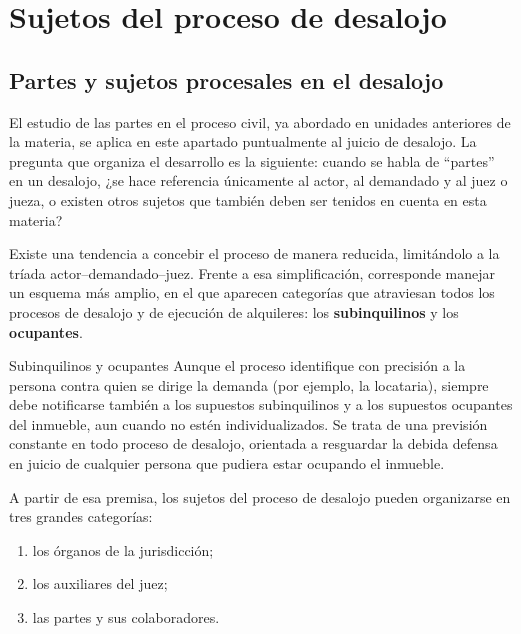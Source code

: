 \documentclass[12pt,oneside]{book}
\begin{document}

\chapter{Sujetos del proceso de desalojo}

\section{Partes y sujetos procesales en el desalojo}

El estudio de las partes en el proceso civil, ya abordado en unidades anteriores de la materia, se aplica en este apartado puntualmente al juicio de desalojo. La pregunta que organiza el desarrollo es la siguiente: cuando se habla de ``partes'' en un desalojo, ¿se hace referencia únicamente al actor, al demandado y al juez o jueza, o existen otros sujetos que también deben ser tenidos en cuenta en esta materia?

Existe una tendencia a concebir el proceso de manera reducida, limitándolo a la tríada actor--demandado--juez. Frente a esa simplificación, corresponde manejar un esquema más amplio, en el que aparecen categorías que atraviesan todos los procesos de desalojo y de ejecución de alquileres: los \textbf{subinquilinos} y los \textbf{ocupantes}.

\begin{definition}{Subinquilinos y ocupantes}
Aunque el proceso identifique con precisión a la persona contra quien se dirige la demanda (por ejemplo, la locataria), siempre debe notificarse también a los supuestos subinquilinos y a los supuestos ocupantes del inmueble, aun cuando no estén individualizados. Se trata de una previsión constante en todo proceso de desalojo, orientada a resguardar la debida defensa en juicio de cualquier persona que pudiera estar ocupando el inmueble.
\end{definition}

A partir de esa premisa, los sujetos del proceso de desalojo pueden organizarse en tres grandes categorías:

\begin{enumerate}
    \item los órganos de la jurisdicción;
    \item los auxiliares del juez;
    \item las partes y sus colaboradores.
\end{enumerate}
\end{document}
